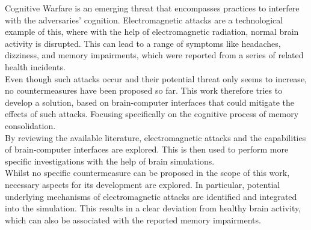 Cognitive Warfare is an emerging threat that encompasses practices to interfere with the adversaries' cognition. Electromagnetic attacks are a technological example of this, where with the help of electromagnetic radiation, normal brain activity is disrupted. This can lead to a range of symptoms like headaches, dizziness, and memory impairments, which were reported from a series of related health incidents.\\
Even though such attacks occur and their potential threat only seems to increase, no countermeasures have been proposed so far.
This work therefore tries to develop a solution, based on brain-computer interfaces that could mitigate the effects of such attacks. Focusing specifically on the cognitive process of memory consolidation.\\
By reviewing the available literature, electromagnetic attacks and the capabilities of brain-computer interfaces are explored. This is then used to perform more specific investigations with the help of brain simulations.\\
Whilst no specific countermeasure can be proposed in the scope of this work, necessary aspects for its development are explored. In particular, potential underlying mechanisms of electromagnetic attacks are identified and integrated into the simulation. This results in a clear deviation from healthy brain activity, which can also be associated with the reported memory impairments. 







